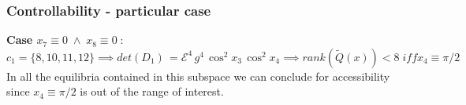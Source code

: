 %
\begin{frame}
\frametitle{Controllability - particular case}
\textbf{Case $x_7 \equiv 0\; \land\; x_8 \equiv 0\;$}:\\[4pt]
$c_1 = \{8,10,11,12\} \implies det(D_1)\,=\mathcal{E}^4\,g^4\,\cos^2 x_{3}\,\cos^2 x_{4} \implies rank(\tilde{Q}(x))<8\; \mathit{iff} x_4\equiv\pi/2$\\[4pt]
In all the equilibria contained in this subspace we can conclude for accessibility since $x_4\equiv\pi/2$ is out of the range of interest.
\end{frame}
